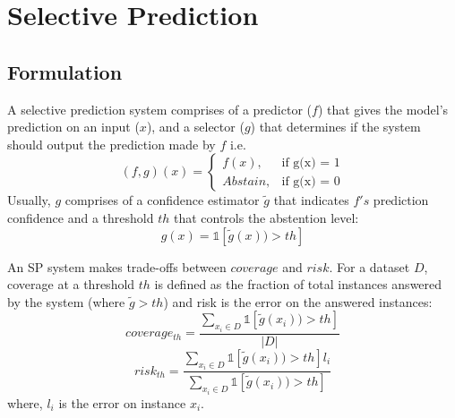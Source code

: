 \documentclass[11pt]{article}
\begin{document}


\section{Selective Prediction}
\subsection{Formulation}
A selective prediction system comprises of a predictor ($f$) that gives the model's prediction on an input ($x$), and a selector ($g$) that determines if the system should output the prediction made by $f$ i.e.
\begin{equation*}
        (f,g)(x) =
            \begin{cases}
              f(x), & \text{if g(x) = 1} \\
              Abstain, & \text{if g(x) = 0}
            \end{cases}
\end{equation*}
Usually, $g$ comprises of a confidence estimator $\tilde{g}$ that indicates $f's$ prediction confidence and a threshold $th$ that controls the abstention level:
\begin{equation*}
    g(x) = \mathbb{1}[\tilde{g}(x)) > th]
\end{equation*}

An SP system makes trade-offs between $coverage$ and $risk$.
For a dataset $D$, coverage at a threshold $th$ is defined as the fraction of total instances answered by the system (where $\tilde{g} > th$) and risk is the error on the answered instances:
\begin{equation*}
    coverage_{th} = \frac{\sum_{x_i \in D} \mathbb{1}[\tilde{g}(x_i)) > th]}{|D|} 
\end{equation*}
\begin{equation*}
    risk_{th} = \frac{\sum_{x_i \in D} \mathbb{1}[\tilde{g}(x_i)) > th]l_i}{\sum_{x_i \in D} \mathbb{1}[\tilde{g}(x_i)) > th]} 
\end{equation*}
where, $l_i$ is the error on instance $x_i$.
\end{document}

